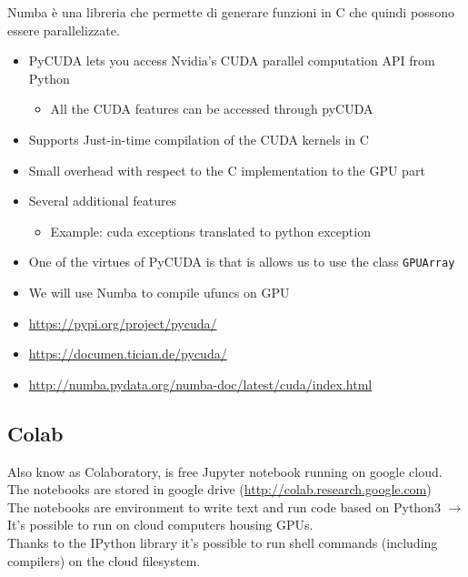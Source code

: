 Numba è una libreria che permette di generare funzioni in C che quindi possono essere parallelizzate.

\begin{itemize}
	\item PyCUDA lets you access Nvidia's CUDA parallel
	computation API from Python
	\begin{itemize}
		\item All the CUDA features can be accessed through pyCUDA
	\end{itemize}
	\item Supports Just-in-time compilation of the CUDA kernels in C
	\item Small overhead with respect to the C implementation to the GPU part
	\item Several additional features
	\begin{itemize}
		\item Example: cuda exceptions translated to python exception
	\end{itemize}
	\item One of the virtues of PyCUDA is that is allows us to use the class \texttt{GPUArray}
	\item We will use Numba to compile ufuncs on GPU
	\item \url{https://pypi.org/project/pycuda/}
	\item \url{https://documen.tician.de/pycuda/}
	\item \url{http://numba.pydata.org/numba-doc/latest/cuda/index.html}
\end{itemize}





\subsection{Colab}

Also know as Colaboratory, is free Jupyter notebook running on google cloud. The notebooks are stored in google drive (\url{http://colab.research.google.com})\\

The notebooks are environment to write
text and run code based on Python3 $\rightarrow$ It’s possible to run on cloud computers housing GPUs.\\

Thanks to the IPython library it’s possible to run shell commands (including compilers) on the cloud filesystem.\\

